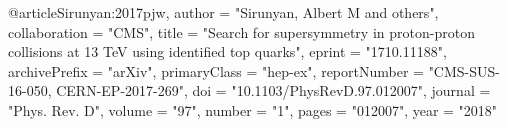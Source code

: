@article{Sirunyan:2017pjw,
    author = "Sirunyan, Albert M and others",
    collaboration = "CMS",
    title = "{Search for supersymmetry in proton-proton collisions at
13 TeV using identified top quarks}",
    eprint = "1710.11188",
    archivePrefix = "arXiv",
    primaryClass = "hep-ex",
    reportNumber = "CMS-SUS-16-050, CERN-EP-2017-269",
    doi = "10.1103/PhysRevD.97.012007",
    journal = "Phys. Rev. D",
    volume = "97",
    number = "1",
    pages = "012007",
    year = "2018"
}
